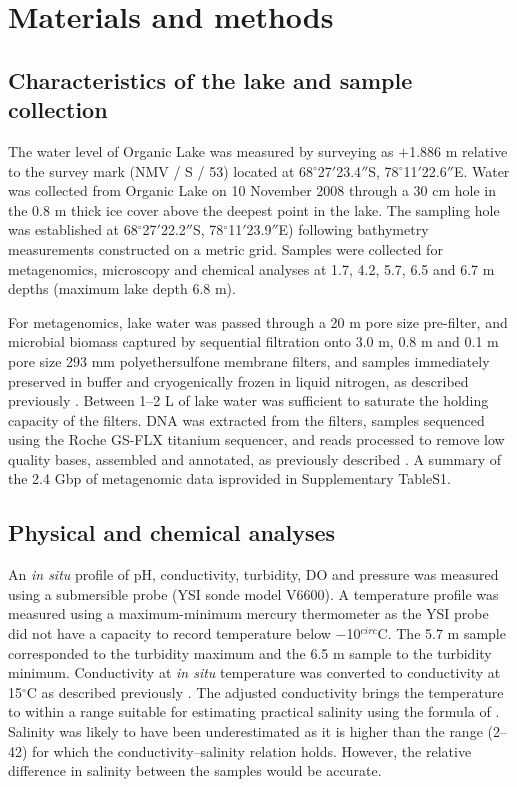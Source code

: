 \section{Materials and methods}
\subsection{Characteristics of the lake and sample collection}
The water level of Organic Lake was measured by surveying as $+$1.886 m relative to the survey mark (NMV / S / 53) located at 68$^{\circ}$27$'$23.4$''$S, 78$^{\circ}$11$'$22.6$''$E.
Water was collected from Organic Lake on 10 November 2008 through a 30 cm hole in the 0.8 m thick ice cover above the deepest point in the lake. 
The sampling hole was established at 68$^{\circ}$27$'$22.2$''$S, 78$^{\circ}$11$'$23.9$''$E) following bathymetry measurements constructed on a metric grid. 
Samples were collected for metagenomics, microscopy and chemical analyses at 1.7, 4.2, 5.7, 6.5 and 6.7 m depths (maximum lake depth 6.8 m).

For metagenomics, lake water was passed through a 20 \textmu{}m pore size pre-filter, and microbial biomass captured by sequential filtration onto 3.0 \textmu{}m, 0.8 \textmu{}m and 0.1 \textmu{}m pore size 293 mm polyethersulfone membrane filters, and samples immediately preserved in buffer and cryogenically frozen in liquid nitrogen, as described previously \cite{Ng2010a, Lauro2011}. 
Between 1--2 L of lake water was sufficient to saturate the holding capacity of the filters. 
\ac{DNA} was extracted from the filters, samples sequenced using the Roche GS-FLX titanium sequencer, and reads processed to remove low quality bases, assembled and annotated, as previously described \cite{Ng2010a, Lauro2011}. 
A summary of the 2.4 Gbp of metagenomic data isprovided in Supplementary TableS1.

\subsection{Physical and chemical analyses}
An \emph{in situ} profile of pH, conductivity, turbidity, \ac{DO} and pressure was measured using a submersible probe (YSI sonde model V6600). 
A temperature profile was measured using a maximum-minimum mercury thermometer as the YSI probe did not have a capacity to record temperature below $-$10$^{circ}$C. 
The 5.7 m sample corresponded to the turbidity maximum and the 6.5 m sample to the turbidity minimum. 
Conductivity at \emph{in situ} temperature was converted to conductivity at 15$^{\circ}$C as described previously \cite{Gibson1999}. 
The adjusted conductivity brings the temperature to within a range suitable for estimating practical salinity using the formula of \citet{Fofonoff1983}. 
Salinity was likely to have been underestimated as it is higher than the range (2--42) for which the conductivity--salinity relation holds. 
However, the relative difference in salinity between the samples would be accurate. 

